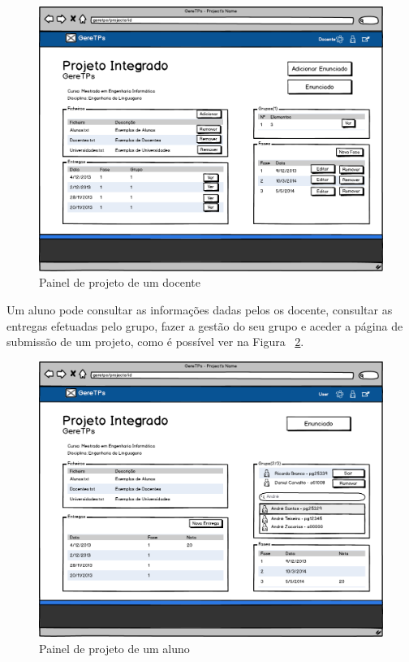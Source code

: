 \begin{figure}[htbp]
        \centering
        \includegraphics[width=1\textwidth]{images/prototipos/mockups/painelprojetodocente.png}
         \caption{Painel de projeto de um docente}
         \label{fig: painelprojetodocente}
\end{figure}

Um aluno pode consultar as informações dadas pelos os docente, consultar as entregas efetuadas pelo grupo, fazer a gestão do seu grupo e aceder a página de submissão de um projeto, como é possível ver na Figura ~\ref{fig: painelprojetoaluno}.\\

\begin{figure}[htbp]
        \centering
        \includegraphics[width=1\textwidth]{images/prototipos/mockups/painelprojetoaluno.png}
         \caption{Painel de projeto de um aluno}
         \label{fig: painelprojetoaluno}
\end{figure}

